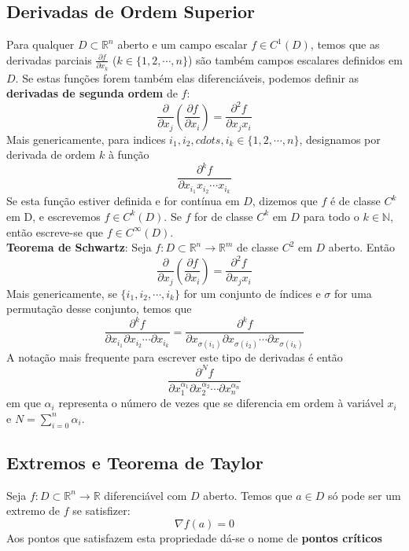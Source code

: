 \documentclass{article}
\begin{document}
\subsection{Derivadas de Ordem Superior}
Para qualquer $D \subset \mathbb{R}^n$ aberto e um campo escalar $f \in C^1(D)$, temos que as derivadas parciais $\frac{\partial f}{\partial x_k}$ ($k \in \{ 1, 2, \cdots, n \}$) são também campos escalares definidos em $D$. Se estas funções forem também elas diferenciáveis, podemos definir as \textbf{derivadas de segunda ordem} de $f$:
$$
\frac{\partial}{\partial x_j} \left( \frac{\partial f}{\partial x_i} \right) = \frac{\partial ^2 f}{\partial x_j x_i}
$$
Mais genericamente, para indices $i_1, i_2, cdots , i_k \in \{ 1, 2, \cdots , n \}$, designamos por derivada de ordem $k$ à função
$$
\frac{\partial ^k f}{\partial x_{i_1}x_{i_2} \cdots x_{i_k}}
$$
Se esta função estiver definida e for contínua em $D$, dizemos que $f$ é de classe $C^k$ em D, e escrevemos $f \in C^k(D)$. Se $f$ for de classe $C^k$ em $D$ para todo o $k \in \mathbb{N}$, então escreve-se que $f \in C ^\infty (D)$.\\

\textbf{Teorema de Schwartz}: Seja $f: D \subset \mathbb{R}^n \to \mathbb{R}^m$ de classe $C^2$ em $D$ aberto. Então
$$
\frac{\partial}{\partial x_j} \left( \frac{\partial f}{\partial x_i} \right) = \frac{\partial ^2 f}{\partial x_j x_i}
$$
Mais genericamente, se $\{ i_1, i_2, \cdots, i_k \}$ for um conjunto de índices e $\sigma$ for uma permutação desse conjunto, temos que
$$
\frac{\partial ^k f}{\partial x_{i_1} \partial x_{i_2} \cdots \partial x_{i_k}} = \frac{\partial ^k f}{\partial x_{\sigma(i_1)} \partial x_{\sigma(i_2)} \cdots \partial x_{\sigma(i_k)}}
$$
A notação mais frequente para escrever este tipo de derivadas é então
$$
\frac{\partial ^N f}{\partial x_1^{\alpha_1} \partial x_2^{\alpha_2} \cdots \partial x_n ^{\alpha_n}}
$$
em que $\alpha_i$ representa o número de vezes que se diferencia em ordem à variável $x_i$ e $N = \sum_{i=0}^n \alpha_i$.

\subsection{Extremos e Teorema de Taylor}
Seja $f: D \subset \mathbb{R}^n \to \mathbb{R}$ diferenciável com $D$ aberto. Temos que $a \in D$ só pode ser um extremo de $f$ se satisfizer:
$$
\nabla f(a)=0
$$
Aos pontos que satisfazem esta propriedade dá-se o nome de \textbf{pontos críticos}
\end{document}

